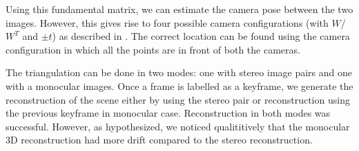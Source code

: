 \documentclass{article}
\begin{document}
Using this fundamental matrix, we can estimate the camera pose between the two images. However, this gives rise to four possible camera configurations (with $W$/$W^T$ and $\pm t$) as described in \cite{Hartley2004}. The correct location can be found using the camera configuration in which all the points are in front of both the cameras.

The triangulation can be done in two modes: one with stereo image pairs and one with a monocular images. Once a frame is labelled as a keyframe, we generate the reconstruction of the scene either by using the stereo pair or reconstruction using the previous keyframe in monocular case. Reconstruction in both modes was successful. However, as hypothesized, we noticed qualititively that the monocular 3D reconstruction had more drift compared to the stereo reconstruction.
\end{document}
